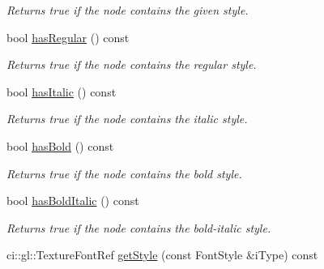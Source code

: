 \begin{DoxyCompactItemize}
\begin{DoxyCompactList}\small\item\em Returns true if the node contains the given style. \end{DoxyCompactList}\item 
\hypertarget{class_font_family_node_a2c351f9900a314fd90abd8dfa4123a6b}{bool \hyperlink{class_font_family_node_a2c351f9900a314fd90abd8dfa4123a6b}{has\-Regular} () const }\label{class_font_family_node_a2c351f9900a314fd90abd8dfa4123a6b}

\begin{DoxyCompactList}\small\item\em Returns true if the node contains the regular style. \end{DoxyCompactList}\item 
\hypertarget{class_font_family_node_a25f6f92d40d692668202f0bc6b48d427}{bool \hyperlink{class_font_family_node_a25f6f92d40d692668202f0bc6b48d427}{has\-Italic} () const }\label{class_font_family_node_a25f6f92d40d692668202f0bc6b48d427}

\begin{DoxyCompactList}\small\item\em Returns true if the node contains the italic style. \end{DoxyCompactList}\item 
\hypertarget{class_font_family_node_aab992d2a3e5f80f6e7a7c01606521292}{bool \hyperlink{class_font_family_node_aab992d2a3e5f80f6e7a7c01606521292}{has\-Bold} () const }\label{class_font_family_node_aab992d2a3e5f80f6e7a7c01606521292}

\begin{DoxyCompactList}\small\item\em Returns true if the node contains the bold style. \end{DoxyCompactList}\item 
\hypertarget{class_font_family_node_abf80202a4fa76a9b3f906e9b5d6993b9}{bool \hyperlink{class_font_family_node_abf80202a4fa76a9b3f906e9b5d6993b9}{has\-Bold\-Italic} () const }\label{class_font_family_node_abf80202a4fa76a9b3f906e9b5d6993b9}

\begin{DoxyCompactList}\small\item\em Returns true if the node contains the bold-\/italic style. \end{DoxyCompactList}\item 
\hypertarget{class_font_family_node_aa72c0bb43d745bd277af69ae3f124e46}{ci\-::gl\-::\-Texture\-Font\-Ref \hyperlink{class_font_family_node_aa72c0bb43d745bd277af69ae3f124e46}{get\-Style} (const Font\-Style \&i\-Type) const }\label{class_font_family_node_aa72c0bb43d745bd277af69ae3f124e46}


\end{DoxyCompactItemize}
